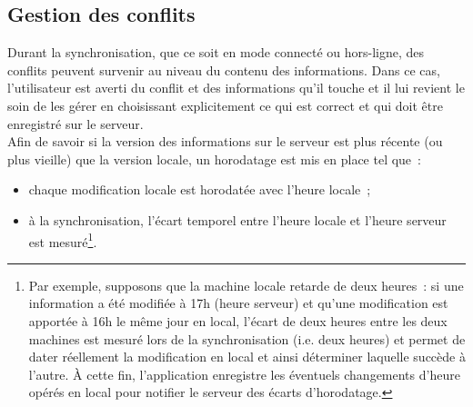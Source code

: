\subsection{Gestion des conflits}
Durant la synchronisation, que ce soit en mode connecté ou hors-ligne, des conflits peuvent survenir au niveau du contenu des informations.
Dans ce cas, l'utilisateur est averti du conflit et des informations qu'il touche et il lui revient le soin de les gérer en choisissant explicitement ce qui est correct et qui doit être enregistré sur le serveur.
\\
Afin de savoir si la version des informations sur le serveur est plus récente (ou plus vieille) que la version locale, un horodatage est mis en place tel que~:
\begin{itemize}
    \item chaque modification locale est horodatée avec l'heure locale~;
    \item à la synchronisation, l'écart temporel entre l'heure locale et l'heure serveur est mesuré\footnote{Par exemple, supposons que la machine locale retarde de deux heures~: si une information a été modifiée à 17h (heure serveur) et qu'une modification est apportée à 16h le même jour en local, l'écart de deux heures entre les deux machines est mesuré lors de la synchronisation (i.e. deux heures) et permet de dater réellement la modification en local et ainsi déterminer laquelle succède à l'autre. À cette fin, l'application enregistre les éventuels changements d'heure opérés en local pour notifier le serveur des écarts d'horodatage.}.
\end{itemize}

